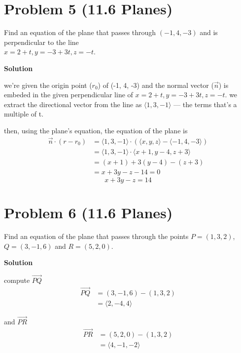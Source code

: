\documentclass{article}
\newcommand{\solution}{\textbf{\large Solution}}
\theoremstyle{remark}
\begin{document}
\vspace{1em}
\hrulefill

\section*{Problem 5 (11.6 Planes)}
Find an equation of the plane that passes through $(-1,4,-3)$ and is perpendicular to the line\\
$x = 2 + t, y = -3 + 3t, z = -t$.

\medskip
\solution

  we're given the origin point ($r_0$) of (-1, 4, -3) and
  the normal vector ($\vec n$) is embeded in the given
  perpendicular line of $x = 2 + t, y = -3 + 3t, z = -t$.
  we extract the directional vector from the line as $\langle
  1, 3, -1 \rangle$ --- the terms that's a multiple of t.

  \vspace{1em}
  then, using the plane's equation, the equation of the plane
  is
  \[
  \begin{aligned}
  \vec n \cdot (r - r_0) &= \langle 1, 3, -1 \rangle \cdot
  (\langle x, y, z \rangle - \langle -1, 4, -3 \rangle) \\
  &= \langle 1, 3, -1 \rangle \cdot \langle x + 1, y - 4, z +
  3 \rangle \\
  &= (x + 1) + 3(y - 4) - (z + 3) \\
  &= x + 3y - z - 14 = 0
  \end{aligned}
  \]
  \[
  \boxed{x + 3y - z = 14}
  \]

\vspace{1em}
\hrulefill

\section*{Problem 6 (11.6 Planes)}
Find an equation of the plane that passes through the points $P = (1, 3, 2)$,\\
$Q = (3, -1, 6)$ and $R = (5, 2, 0)$.

\medskip
\solution

 compute $\overrightarrow{PQ}$
  \[
  \begin{aligned}
  \overrightarrow{PQ} &= (3,-1,6) - (1,3,2) \\
  &= \langle 2,-4,4 \rangle
  \end{aligned}
  \]

  and $\overrightarrow{PR}$
  \[
  \begin{aligned}
  \overrightarrow{PR} &= (5,2,0) - (1,3,2) \\
  &= \langle 4,-1,-2 \rangle
  \end{aligned}
  \]
\end{document}

